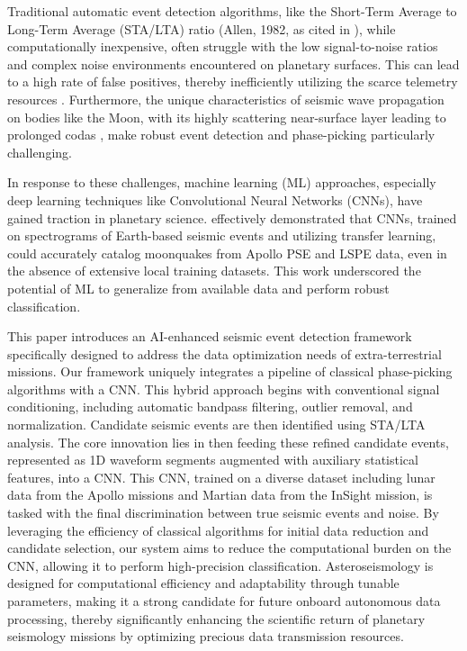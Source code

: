 \documentclass[conference]{IEEEtran}
\begin{document}
    Traditional automatic event detection algorithms, like the Short-Term Average to Long-Term Average (STA/LTA) ratio
    (Allen, 1982, as cited in \cite{Civilini2021}), while computationally inexpensive, often struggle with the low
    signal-to-noise ratios and complex noise environments encountered on planetary surfaces. This can lead to a high
    rate of false positives, thereby inefficiently utilizing the scarce telemetry resources \cite{Civilini2021}.
    Furthermore, the unique characteristics of seismic wave propagation on bodies like the Moon, with its highly
    scattering near-surface layer leading to prolonged codas \cite{Dainty1981, Nakamura1982} , make robust event
    detection and phase-picking particularly challenging.

    In response to these challenges, machine learning (ML) approaches, especially deep learning techniques like
    Convolutional Neural Networks (CNNs), have gained traction in planetary science. \cite{Civilini2021} effectively
    demonstrated that CNNs, trained on spectrograms of Earth-based seismic events and utilizing transfer learning, could
    accurately catalog moonquakes from Apollo PSE and LSPE data, even in the absence of extensive local training
    datasets. This work underscored the potential of ML to generalize from available data and perform robust
    classification.

    This paper introduces an AI-enhanced seismic event detection framework specifically designed to
    address the data optimization needs of extra-terrestrial missions. Our framework uniquely integrates a pipeline of
    classical phase-picking algorithms with a CNN. This hybrid approach begins with conventional signal
    conditioning, including automatic bandpass filtering, outlier removal, and normalization. Candidate seismic events
    are then identified using STA/LTA analysis. The core innovation lies in then feeding these refined candidate events,
    represented as 1D waveform segments augmented with auxiliary statistical features, into a CNN. This CNN, trained on
    a diverse dataset including lunar data from the Apollo missions and Martian data from the InSight mission, is tasked
    with the final discrimination between true seismic events and noise. By leveraging the efficiency of classical
    algorithms for initial data reduction and candidate selection, our system aims to reduce the computational burden on
    the CNN, allowing it to perform high-precision classification. Asteroseismology is designed for computational
    efficiency and adaptability through tunable parameters, making it a strong candidate for future onboard autonomous
    data processing, thereby significantly enhancing the scientific return of planetary seismology missions by
    optimizing precious data transmission resources.
\end{document}
